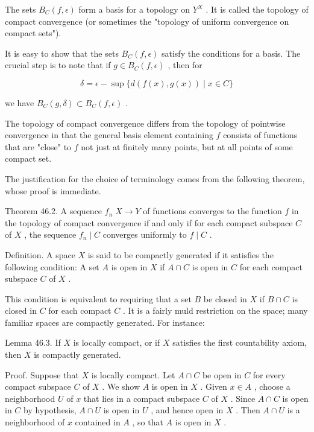 \documentclass[10pt]{article}
\begin{document}
The sets \({B}_{C}\left( {f,\epsilon }\right)\) form a basis for a topology on \({Y}^{X}\) . It is called the topology of compact convergence (or sometimes the "topology of uniform convergence on compact sets").

It is easy to show that the sets \({B}_{C}\left( {f,\epsilon }\right)\) satisfy the conditions for a basis. The crucial step is to note that if \(g \in  {B}_{C}\left( {f,\epsilon }\right)\) , then for

\[
\delta  = \epsilon  - \sup \{ d\left( {f\left( x\right) ,g\left( x\right) }\right)  \mid  x \in  C\}
\]

we have \({B}_{C}\left( {g,\delta }\right)  \subset  {B}_{C}\left( {f,\epsilon }\right)\) .

The topology of compact convergence differs from the topology of pointwise convergence in that the general basis element containing \(f\) consists of functions that are "close" to \(f\) not just at finitely many points, but at all points of some compact set.

The justification for the choice of terminology comes from the following theorem, whose proof is immediate.

Theorem 46.2. A sequence \({f}_{n}\;X \rightarrow  Y\) of functions converges to the function \(f\) in the topology of compact convergence if and only if for each compact subspace \(C\) of \(X\) , the sequence \({f}_{n} \mid  C\) converges uniformly to \(f \mid  C\) .

Definition. A space \(X\) is said to be compactly generated if it satisfies the following condition: A set \(A\) is open in \(X\) if \(A \cap  C\) is open in \(C\) for each compact subspace \(C\) of \(X\) .

This condition is equivalent to requiring that a set \(B\) be closed in \(X\) if \(B \cap  C\) is closed in \(C\) for each compact \(C\) . It is a fairly muld restriction on the space; many familiar spaces are compactly generated. For instance:

Lemma 46.3. If \(X\) is locally compact, or if \(X\) satisfies the first countability axiom, then \(X\) is compactly generated.

Proof. Suppose that \(X\) is locally compact. Let \(A \cap  C\) be open in \(C\) for every compact subspace \(C\) of \(X\) . We show \(A\) is open in \(X\) . Given \(x \in  A\) , choose a neighborhood \(U\) of \(x\) that lies in a compact subspace \(C\) of \(X\) . Since \(A \cap  C\) is open in \(C\) by hypothesis, \(A \cap  U\) is open in \(U\) , and hence open in \(X\) . Then \(A \cap  U\) is a neighborhood of \(x\) contained in \(A\) , so that \(A\) is open in \(X\) .
\end{document}
